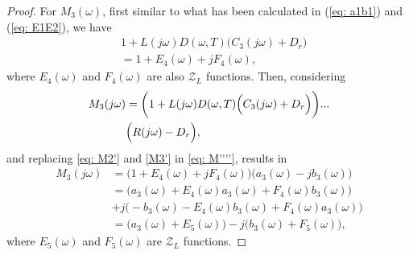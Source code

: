 \begin{proof}
For $M_3(\omega)$, first similar to what has been calculated in (\ref{eq: a1b1}) and (\ref{eq: E1E2}), we have
 \begin{equation}
 \label{M3'}
     \begin{split}
         &1+L(j\omega) D(\omega,T)\Big(C_3(j\omega)+D_r\Big)\\
         &=1+E_4(\omega)+jF_4(\omega),
     \end{split}
 \end{equation}
 where $E_4(\omega)$ and $F_4(\omega)$ are also $\mathcal{Z}_L$ functions. Then, considering
 \begin{equation}
     \begin{split}
     \label{eq: M''''}
         M_3(j\omega)&=\bigg(1+L(j\omega) D(\omega,T)\Big(C_3(j\omega)+D_r\Big)\bigg)...\\
         &\Bigl(R(j\omega)-D_r\Bigl),
              \end{split}
 \end{equation}
 and replacing \eqref{eq: M2'} and \eqref{M3'} in \eqref{eq: M''''}, results in
 \begin{equation}
     \begin{split}
     \label{eq: M'''''}
         M_3(j\omega)&=\Big(1+E_4(\omega)+jF_4(\omega)\Big)\Big(a_3(\omega)-jb_3(\omega)\Big)\\
         &=\bigg(a_3(\omega)+E_4(\omega)a_3(\omega)+F_4(\omega
         )b_3(\omega)\bigg)\\
         &+j\bigg(-b_3(\omega)-E_4(\omega)b_3(\omega)+F_4(\omega) a_3(\omega)\bigg)\\
         &=\Big(a_3(\omega)+E_5(\omega)\Big)-j\Big(b_3(\omega)+F_5(\omega)\Big),
     \end{split}
 \end{equation}
where $E_5(\omega)$ and $F_5(\omega)$ are $\mathcal{Z}_L$ functions.


\end{proof}
